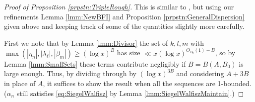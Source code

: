 \documentclass[10pt]{amsart}
\theoremstyle{plain}
\numberwithin{equation}{section}
\begin{document}
%
%
%
%
%
%
%
%
\begin{proof}[Proof of Proposition \ref{prpstn:TripleRough}]
This is similar to \cite[Theorem 4]{BFI2}, but using our refinements Lemma \ref{lmm:NewBFI} and Proposition \ref{prpstn:GeneralDispersion} given above and keeping track of some of the quantities slightly more carefully.

First we note that by Lemma \ref{lmm:Divisor} the set of $k,l,m$ with $\max(|\eta_n|,|\lambda_\ell|,|\beta_m|)\ge(\log{x})^B$ has size $\ll x(\log{x})^{O_{B_0}(1)-B}$, so by Lemma \ref{lmm:SmallSets} these terms contribute negligibly if $B=B(A,B_0)$ is large enough. Thus, by dividing through by $(\log{x})^{3B}$ and considering $A+3B$ in place of $A$, it suffices to show the result when all the sequences are 1-bounded. ($\alpha_n$ still satisfies \eqref{eq:SiegelWalfisz} by Lemma \ref{lmm:SiegelWalfiszMaintain}.)


\end{proof}
\end{document}
